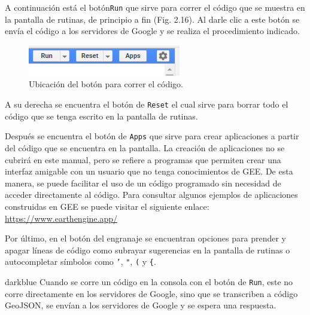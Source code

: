 \documentclass[
  12pt,
  letterpaper,
  twoside]{book}
\begin{document}
A continuación está el botón\texttt{Run} que sirve para correr el código que se muestra en la pantalla de rutinas, de principio a fin (Fig. 2.16). Al darle clic a este botón se envía el código a los servidores de Google y se realiza el procedimiento indicado.

\begin{figure}[btp]

{\centering \includegraphics[width=0.3\linewidth]{Img/run} 

}

\caption{Ubicación del botón para correr el código.}\label{fig:unnamed-chunk-17}
\end{figure}

A su derecha se encuentra el botón de \texttt{Reset} el cual sirve para borrar todo el código que se tenga escrito en la pantalla de rutinas.

Después se encuentra el botón de \texttt{Apps} que sirve para crear aplicaciones a partir del código que se encuentra en la pantalla. La creación de aplicaciones no se cubrirá en este manual, pero se refiere a programas que permiten crear una interfaz amigable con un usuario que no tenga conocimientos de GEE. De esta manera, se puede facilitar el uso de un código programado sin necesidad de acceder directamente al código. Para consultar algunos ejemplos de aplicaciones construidas en GEE se puede visitar el siguiente enlace: \url{https://www.earthengine.app/}

Por último, en el botón del engranaje se encuentran opciones para prender y apagar líneas de código como subrayar sugerencias en la pantalla de rutinas o autocompletar símbolos como \texttt{’}, \texttt{"}, \texttt{(} y \texttt{\{}.

\begin{bluebox2}

\begin{awesomeblock}{5pt}{\faLightbulb}{darkblue}
Cuando se corre un código en la consola con el botón de \texttt{Run}, este no corre directamente en los servidores de Google, sino que se transcriben a código GeoJSON, se envían a los servidores de Google y se espera una respuesta.

\end{awesomeblock}

\end{bluebox2}
\end{document}
